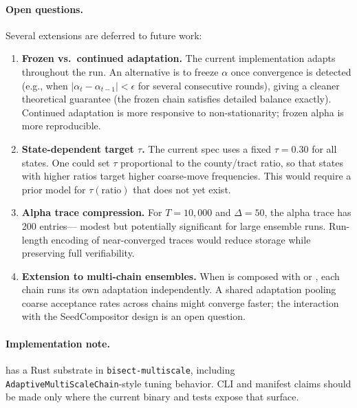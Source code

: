 \paragraph{Open questions.}
Several extensions are deferred to future work:

\begin{enumerate}
  \item \textbf{Frozen vs.\ continued adaptation.}
    The current implementation adapts throughout the run.
    An alternative is to freeze $\alpha$ once convergence is detected
    (e.g., when $|\alpha_t - \alpha_{t-1}| < \epsilon$ for several consecutive
    rounds), giving a cleaner theoretical guarantee (the frozen chain
    satisfies detailed balance exactly).
    Continued adaptation is more responsive to non-stationarity; frozen
    alpha is more reproducible.

  \item \textbf{State-dependent target $\tau$.}
    The current spec uses a fixed $\tau = 0.30$ for all states.
    One could set $\tau$ proportional to the county/tract ratio, so that
    states with higher ratios target higher coarse-move frequencies.
    This would require a prior model for $\tau(\text{ratio})$ that does not
    yet exist.

  \item \textbf{Alpha trace compression.}
    For $T = 10{,}000$ and $\Delta = 50$, the alpha trace has 200 entries---
    modest but potentially significant for large ensemble runs.
    Run-length encoding of near-converged traces would reduce storage while
    preserving full verifiability.

  \item \textbf{Extension to multi-chain ensembles.}
    When \ams{} is composed with \cs{} or \be{}, each chain runs its own
    adaptation independently.
    A shared adaptation pooling coarse acceptance rates across chains might
    converge faster; the interaction with the SeedCompositor design is an
    open question.
\end{enumerate}

\paragraph{Implementation note.}
\ams{} has a Rust substrate in \texttt{bisect-multiscale}, including
\texttt{AdaptiveMultiScaleChain}-style tuning behavior.  CLI and manifest
claims should be made only where the current binary and tests expose that
surface.
